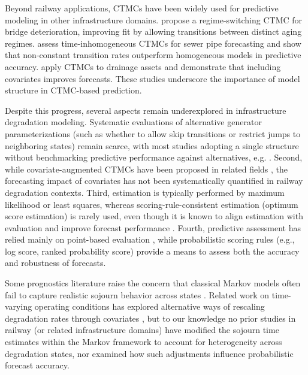 Beyond railway applications, CTMCs have been widely used for predictive modeling in other infrastructure domains. \citet{Mizutani2023RegimeSwitching} propose a regime-switching CTMC for bridge deterioration, improving fit by allowing transitions between distinct aging regimes. \citet{JimenezRoa2024Nonhomogeneous} assess time-inhomogeneous CTMCs for sewer pipe forecasting and show that non-constant transition rates outperform homogeneous models in predictive accuracy. \citet{Wu2021ConditionPrediction} apply CTMCs to drainage assets and demonstrate that including covariates improves forecasts. These studies underscore the importance of model structure in CTMC-based prediction.

Despite this progress, several aspects remain underexplored in infrastructure degradation modeling.
Systematic evaluations of alternative generator parameterizations (such as whether to allow skip transitions or restrict jumps to neighboring states) remain scarce, with most studies adopting a single structure without benchmarking predictive performance against alternatives, e.g. \citep{bisgaard2024A,Zbiciak2025}.
Second, while covariate-augmented CTMCs have been proposed in related fields \citep{Wu2021ConditionPrediction}, the forecasting impact of covariates has not been systematically quantified in railway degradation contexts.
Third, estimation is typically performed by maximum likelihood or least squares, whereas scoring-rule-consistent estimation (optimum score estimation) is rarely used, even though it is known to align estimation with evaluation and improve forecast performance \citep{Gneiting2007,friedman1983a,Copas1983}.
Fourth, predictive assessment has relied mainly on point-based evaluation \citep{JimenezRoa2024Nonhomogeneous,Mizutani2023RegimeSwitching}, while probabilistic scoring rules (e.g., log score, ranked probability score) provide a means to assess both the accuracy and robustness of forecasts.

Some prognostics literature raise the concern that classical Markov models often fail to capture realistic sojourn behavior across states \citep{AIZPURUA2022}. Related work on time-varying operating conditions has explored alternative ways of rescaling degradation rates through covariates \citep{liu2024a,bisgaard2024A}, but to our knowledge no prior studies in railway (or related infrastructure domains) have modified the sojourn time estimates within the Markov framework to account for heterogeneity across degradation states, nor examined how such adjustments influence probabilistic forecast accuracy.



